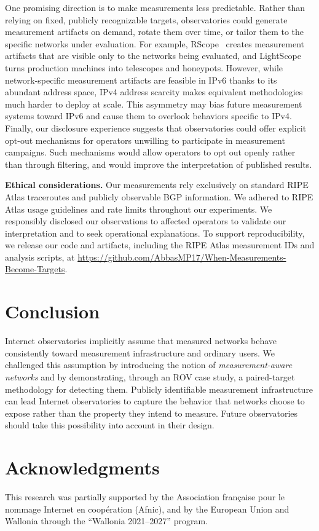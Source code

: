 \documentclass[sigconf, 10pt]{acmart}
\begin{document}
One promising direction is to make measurements less predictable. Rather than relying on fixed, publicly recognizable targets, observatories could generate measurement artifacts on demand, rotate them over time, or tailor them to the specific networks under evaluation. For example, RScope~\cite{rscope} creates measurement artifacts that are visible only to the networks being evaluated, and LightScope~\cite{lightscope} turns production machines into telescopes and honeypots. However, while network-specific measurement artifacts are feasible in IPv6 thanks to its abundant address space, IPv4 address scarcity makes equivalent methodologies much harder to deploy at scale. This asymmetry may bias future measurement systems toward IPv6 and cause them to overlook behaviors specific to IPv4. Finally, our disclosure experience suggests that observatories could offer explicit opt-out mechanisms for operators unwilling to participate in measurement campaigns. Such mechanisms would allow operators to opt out openly rather than through filtering, and would improve the interpretation of published results.

\noindent\textbf{Ethical considerations.}
Our measurements rely exclusively on standard RIPE Atlas traceroutes and publicly observable BGP information. We adhered to RIPE Atlas usage guidelines and rate limits throughout our experiments. We responsibly disclosed our observations to affected operators to validate our interpretation and to seek operational explanations. To support reproducibility, we release our code and artifacts, including the RIPE Atlas measurement IDs and analysis scripts, at \url{https://github.com/AbbasMP17/When-Measurements-Become-Targets}.

\section{Conclusion}

Internet observatories implicitly assume that measured networks behave consistently toward measurement infrastructure and ordinary users. We challenged this assumption by introducing the notion of \emph{measurement-aware networks} and by demonstrating, through an ROV case study, a paired-target methodology for detecting them. Publicly identifiable measurement infrastructure can lead Internet observatories to capture the behavior that networks choose to expose rather than the property they intend to measure. Future observatories should take this possibility into account in their design.

\section{Acknowledgments}

This research was partially supported by the Association fran\c{c}aise pour le nommage Internet en coop\'eration (Afnic), and by the European Union and Wallonia through the ``Wallonia 2021--2027'' program.



\end{document}
